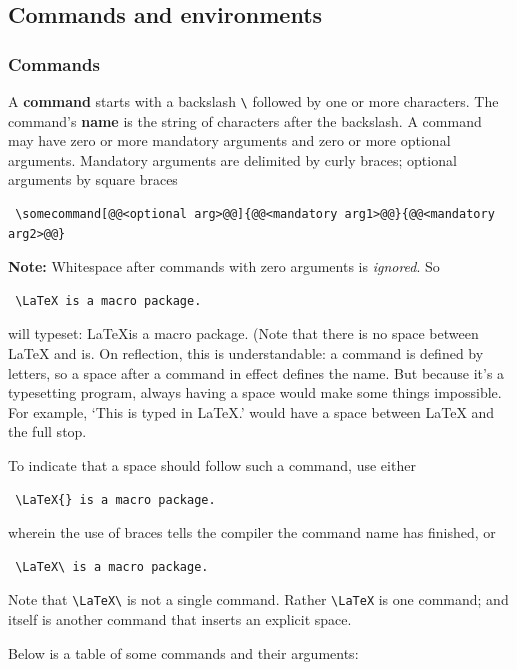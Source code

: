 \documentclass[a4paper,11pt]{scrartcl}\usepackage[]{graphicx}\usepackage[]{color}
\newcommand{\defi}[1]{\textbf{\textsf{#1}}}
\newcommand{\Code}[1]{\Colorbox{gray!10}{\lstinline!#1!}}
\begin{document}
 
 \subsection{Commands and environments}
 \subsubsection{Commands}
 A \defi{command} starts with a backslash \verb=\= followed by one or more characters.
 The command's \defi{name} is the string of characters after the backslash. 
 A {command} may have zero or more mandatory arguments and zero or more optional arguments. 
 Mandatory arguments are delimited by curly braces; optional arguments by square braces

 \begin{lstlisting}
 \somecommand[@@<optional arg>@@]{@@<mandatory arg1>@@}{@@<mandatory arg2>@@}
 \end{lstlisting} 

 \textbf{\textsf{Note:}} Whitespace after commands with zero arguments is \emph{ignored}. So 

 \begin{lstlisting}
 \LaTeX is a macro package.
 \end{lstlisting}
 
 will typeset: \LaTeX is a macro package. (Note that there is no space between \LaTeX{} and is. 
 On reflection, this is understandable: a command is defined by letters, so a space after a command in effect defines the name.
 But because it's a typesetting program, always having a space would make some things impossible. 
 For example, `This is typed in \LaTeX.' would have a space between \LaTeX{} and the full stop.

 To indicate that a space should follow such a command, use either 

 \begin{lstlisting}
 \LaTeX{} is a macro package.
 \end{lstlisting}
 wherein the use of braces tells the compiler the command name has finished, or 

 \begin{lstlisting}
 \LaTeX\ is a macro package.
 \end{lstlisting}
 Note that \lstinline!\LaTeX\! is not a single command. 
 Rather \lstinline!\LaTeX! is one command; and \Code{\\  } itself is another command that inserts an explicit space. 


 Below is a table of some commands and their arguments:
 
\end{document}
